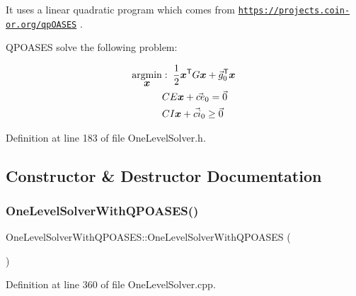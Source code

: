 It uses a linear quadratic program which comes from \href{https://projects.coin-or.org/qpOASES}{\tt https\+://projects.\+coin-\/or.\+org/qp\+O\+A\+S\+ES} .

Q\+P\+O\+A\+S\+ES solve the following problem\+:

\begin{align*} \underset{\mbox{\boldmath${x}$}}{\operatorname{argmin}} &: \; \frac{1}{2} \mbox{\boldmath${x}$}^{\mathsf{T}} G \mbox{\boldmath${x}$} + \vec{g}_0^{\mathsf{T}} \mbox{\boldmath${x}$} \\ & CE \mbox{\boldmath${x}$} + \vec{ce}_0 = \vec{0} \\ & CI \mbox{\boldmath${x}$} + \vec{ci}_0 \geq \vec{0} \end{align*} 

Definition at line 183 of file One\+Level\+Solver.\+h.



\subsection{Constructor \& Destructor Documentation}
\hypertarget{classocra_1_1OneLevelSolverWithQPOASES_a5540c732d87204ed0779b3fbaa5667b7}{}\label{classocra_1_1OneLevelSolverWithQPOASES_a5540c732d87204ed0779b3fbaa5667b7} 
\subsubsection{\texorpdfstring{One\+Level\+Solver\+With\+Q\+P\+O\+A\+S\+E\+S()}{OneLevelSolverWithQPOASES()}}
{\footnotesize\ttfamily One\+Level\+Solver\+With\+Q\+P\+O\+A\+S\+E\+S\+::\+One\+Level\+Solver\+With\+Q\+P\+O\+A\+S\+ES (\begin{DoxyParamCaption}{ }\end{DoxyParamCaption})}



Definition at line 360 of file One\+Level\+Solver.\+cpp.

\hypertarget{classocra_1_1OneLevelSolverWithQPOASES_adf42bcbdf5c169be4fe51c025ed49c53}{}\label{classocra_1_1OneLevelSolverWithQPOASES_adf42bcbdf5c169be4fe51c025ed49c53} 
